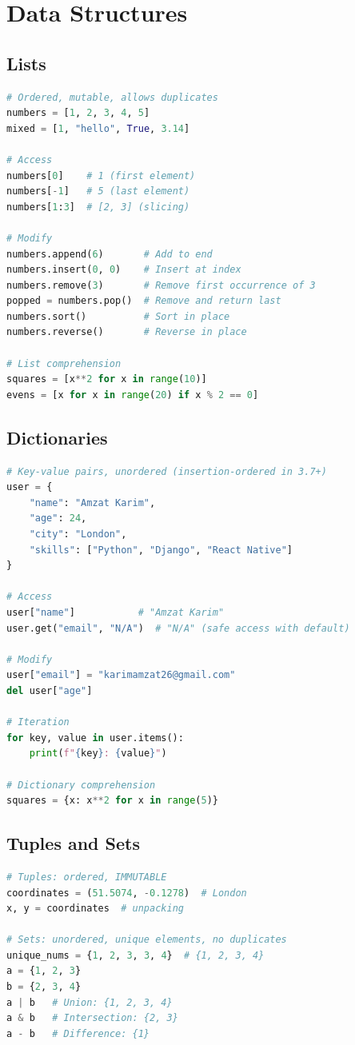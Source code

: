 \documentclass[12pt, a4paper, oneside]{book}
\begin{document}
\section{Data Structures}

\subsection{Lists}
\begin{lstlisting}[language=Python, caption={Lists}]
# Ordered, mutable, allows duplicates
numbers = [1, 2, 3, 4, 5]
mixed = [1, "hello", True, 3.14]

# Access
numbers[0]    # 1 (first element)
numbers[-1]   # 5 (last element)
numbers[1:3]  # [2, 3] (slicing)

# Modify
numbers.append(6)       # Add to end
numbers.insert(0, 0)    # Insert at index
numbers.remove(3)       # Remove first occurrence of 3
popped = numbers.pop()  # Remove and return last
numbers.sort()          # Sort in place
numbers.reverse()       # Reverse in place

# List comprehension
squares = [x**2 for x in range(10)]
evens = [x for x in range(20) if x % 2 == 0]
\end{lstlisting}

\subsection{Dictionaries}
\begin{lstlisting}[language=Python, caption={Dictionaries}]
# Key-value pairs, unordered (insertion-ordered in 3.7+)
user = {
    "name": "Amzat Karim",
    "age": 24,
    "city": "London",
    "skills": ["Python", "Django", "React Native"]
}

# Access
user["name"]           # "Amzat Karim"
user.get("email", "N/A")  # "N/A" (safe access with default)

# Modify
user["email"] = "karimamzat26@gmail.com"
del user["age"]

# Iteration
for key, value in user.items():
    print(f"{key}: {value}")

# Dictionary comprehension
squares = {x: x**2 for x in range(5)}
\end{lstlisting}

\subsection{Tuples and Sets}
\begin{lstlisting}[language=Python, caption={Tuples and Sets}]
# Tuples: ordered, IMMUTABLE
coordinates = (51.5074, -0.1278)  # London
x, y = coordinates  # unpacking

# Sets: unordered, unique elements, no duplicates
unique_nums = {1, 2, 3, 3, 4}  # {1, 2, 3, 4}
a = {1, 2, 3}
b = {2, 3, 4}
a | b   # Union: {1, 2, 3, 4}
a & b   # Intersection: {2, 3}
a - b   # Difference: {1}
\end{lstlisting}
\end{document}
